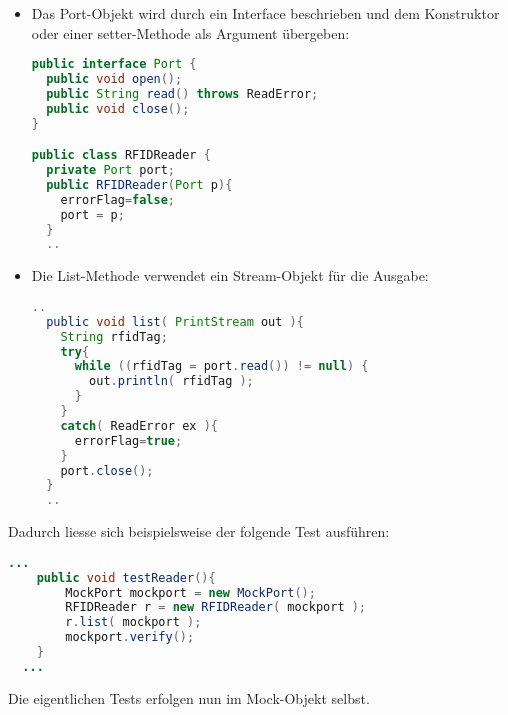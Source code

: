 \begin{itemize}
\item Das Port-Objekt wird durch ein Interface beschrieben und dem Konstruktor
  oder einer setter-Methode als Argument übergeben:
\newslide
  \begin{lstlisting}[language=java]
public interface Port {
  public void open();
  public String read() throws ReadError;
  public void close();
}

public class RFIDReader {
  private Port port;
  public RFIDReader(Port p){
    errorFlag=false;
    port = p;
  }
  ..
  \end{lstlisting}
\newslide
\item Die List-Methode verwendet ein Stream-Objekt für die Ausgabe:
  \begin{lstlisting}[language=java]
    ..
  public void list( PrintStream out ){
    String rfidTag;
    try{
      while ((rfidTag = port.read()) != null) {
        out.println( rfidTag );
      }
    }
    catch( ReadError ex ){
      errorFlag=true;
    }
    port.close();
  }
  ..
  \end{lstlisting}
\end{itemize}
Dadurch liesse sich beispielsweise der folgende Test ausführen:
\begin{lstlisting}[language=java]
  ...
    public void testReader(){
        MockPort mockport = new MockPort();
        RFIDReader r = new RFIDReader( mockport );
        r.list( mockport );
        mockport.verify();
    }
  ...
\end{lstlisting}
Die eigentlichen Tests erfolgen nun im Mock-Objekt selbst.

